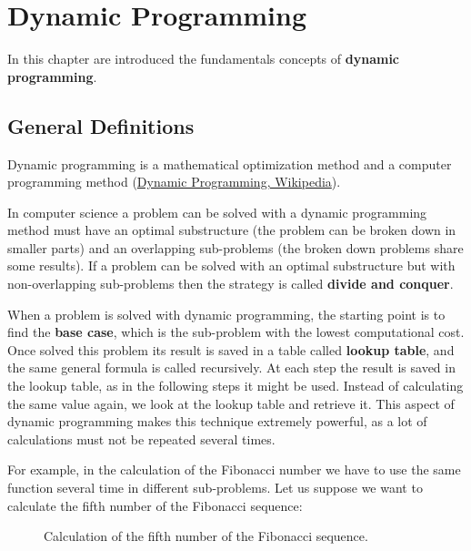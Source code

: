\chapter{Dynamic Programming}
\label{chp:dynamicprogramming}
In this chapter are introduced the fundamentals concepts of \textbf{dynamic programming}.
 
\section{General Definitions}
Dynamic programming is a mathematical optimization method and a computer programming method \cite{wikidynamicprogramming} (\href{https://en.wikipedia.org/wiki/Dynamic_programming}{Dynamic Programming, Wikipedia}).

In computer science a problem can be solved with a dynamic programming method must have an optimal substructure (the problem can be broken down in smaller parts) and an overlapping sub-problems (the broken down problems share some results). If a problem can be solved with an optimal substructure but with non-overlapping sub-problems then the strategy is called \textbf{divide and conquer}.

When a problem is solved with dynamic programming, the starting point is to find the \textbf{base case}, which is the sub-problem with the lowest computational cost. Once solved this problem its result is saved in a table called \textbf{lookup table}, and the same general formula is called recursively. At each step the result is saved in the lookup table, as in the following steps it might be used. Instead of calculating the same value again, we look at the lookup table and retrieve it. This aspect of dynamic programming makes this technique extremely powerful, as a lot of calculations must not be repeated several times.

For example, in the calculation of the Fibonacci number we have to use the same function several time in different sub-problems. Let us suppose we want to calculate the fifth number of the Fibonacci sequence:

\begin{figure}[H]
\centering
{}
\caption[Calculation of the fifth number of the Fibonacci sequence.]{Calculation of the fifth number of the Fibonacci sequence.}
\end{figure}

